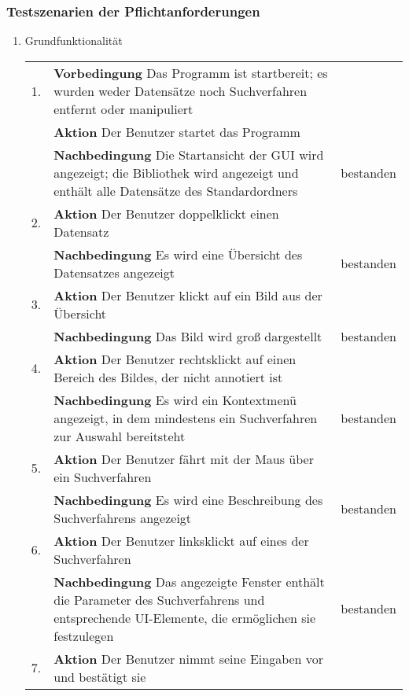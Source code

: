 \subsubsection{Testszenarien der Pflichtanforderungen}
\begin{enumerate} [label=\bfseries /TS \arabic*0/, leftmargin=*]
	\item Grundfunktionalität \newline \newline
	\begin{tabular}{@{}rp{4in}|l}
	1. & \textbf{Vorbedingung} Das Programm ist startbereit; es wurden weder Datensätze noch Suchverfahren entfernt oder manipuliert & \\
	   & \textbf{Aktion} Der Benutzer startet das Programm &  \\
	   & \textbf{Nachbedingung} Die Startansicht der GUI wird angezeigt; die Bibliothek wird angezeigt und enthält alle Datensätze des Standardordners & bestanden \\
	\hline
	2. & \textbf{Aktion} Der Benutzer doppelklickt einen Datensatz & \\
	   & \textbf{Nachbedingung} Es wird eine Übersicht des Datensatzes angezeigt & bestanden \\
	\hline
	3. & \textbf{Aktion} Der Benutzer klickt auf ein Bild aus der Übersicht & \\
	   & \textbf{Nachbedingung} Das Bild wird groß dargestellt & bestanden \\
	\hline    
    4. & \textbf{Aktion} Der Benutzer rechtsklickt auf einen Bereich des Bildes, der nicht annotiert ist & \\
       & \textbf{Nachbedingung} Es wird ein Kontextmenü angezeigt, in dem mindestens ein Suchverfahren zur Auswahl bereitsteht & bestanden \\
	\hline    
    5. & \textbf{Aktion} Der Benutzer fährt mit der Maus über ein Suchverfahren & \\
	   & \textbf{Nachbedingung} Es wird eine Beschreibung des Suchverfahrens angezeigt & bestanden \\
	\hline    
    6. & \textbf{Aktion} Der Benutzer linksklickt auf eines der Suchverfahren & \\
	   & \textbf{Nachbedingung} Das angezeigte Fenster enthält die Parameter des Suchverfahrens und entsprechende UI-Elemente, die ermöglichen sie festzulegen & bestanden \\
	\hline	
	7. & \textbf{Aktion} Der Benutzer nimmt seine Eingaben vor und bestätigt sie & \\

\end{tabular}
\end{enumerate}
